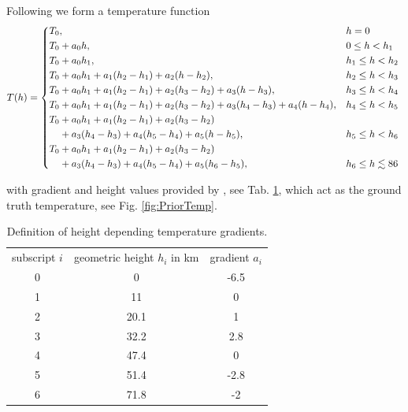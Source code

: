 Following \cite{atmosphere1976us} we form a temperature function
\begin{align}
	T(h) = \begin{cases*}
			T_0 ,&\text{$h = 0$}\\
			T_0 + a_0 h   ,&\text{$0 \leq h < h_{1}$}\\
			T_0 + a_0 h_{1} , &\text{$h_{1} \leq  h < h_{2}$}\\
			T_0 + a_0 h_{1} + a_1 (h_2   - h_1)  + a_2 (h   - h_2)  , &\text{$h_{2} \leq h < h_{3}$}\\
			T_0 + a_0 h_{1} + a_1 (h_2   - h_1)  + a_2 (h_3   - h_2) + a_3 (h   - h_3), &\text{$h_{3} \leq h < h_{4}$}\\
			T_0 + a_0 h_{1} + a_1 (h_2   - h_1)  + a_2 (h_3   - h_2) + a_3 (h_4   - h_3)+ a_4 (h   - h_4) , &\text{$h_{4} \leq h < h_{5}$}\\
			T_0 + a_0 h_{1} + a_1 (h_2   - h_1)  + a_2 (h_3   - h_2) &\nonumber \\
			\hphantom{{} T_0 } + a_3 (h_4   - h_3) + a_4 (h_5   - h_4)+ a_5 (h   - h_5), &\text{$h_{5} \leq h < h_{6}$}\\
			T_0 + a_0 h_{1} + a_1 (h_2   - h_1) + a_2 (h_3   - h_2)  &\nonumber\\
			\hphantom{{} T_0} + a_3 (h_4   - h_3) + a_4 (h_5   - h_4)+ a_5 (h_6   - h_5) , &\text{$h_{6} \leq h \lesssim 86$}
	\end{cases*} 
\label{eq:tempFunc}
\end{align}

with gradient and height values provided by \cite{atmosphere1976us}, see Tab. \ref{tab:tempGrad}, which act as the ground truth temperature, see Fig. \ref{fig:PriorTemp}.
\begin{table}
	\centering
	\begin{tabular}{ |c||c|c|  }
		\hline
		subscript $i$ & geometric height $h_i$ in km&gradient $a_i$\\
		\hhline{|=||=|=|}
		0& 0 & -6.5\\
		1& 11 & 0\\
		2& 20.1& 1\\
		3& 32.2& 2.8\\
		4& 47.4& 0\\
		5& 51.4& -2.8\\
		6& 71.8& -2\\
		\hline
	\end{tabular}
\caption[Temperature gradients]{Definition of height depending temperature gradients.}
\label{tab:tempGrad}
\end{table}

